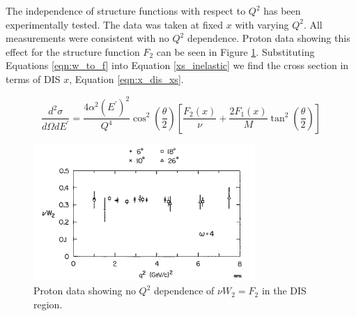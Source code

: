The independence of structure functions with respect to $Q^2$ has been experimentally tested. The data was taken at fixed $x$ with varying $Q^2$. All measurements were consistent with no $Q^2$ dependence. Proton data showing this effect for the structure function $F_2$ can be seen in Figure \ref{fig:noQ2F2}. Substituting Equations \ref{eqn:w_to_f} into Equation \ref{xs_inelastic} we find the cross section in terms of DIS $x$, Equation \ref{eqn:x_dis_xs}.

\begin{equation}
	\frac{d^2\sigma}{d\Omega dE^\prime} = \frac{4\alpha^2\left(E^\prime\right)^2}{Q^4}\cos^2\left(\frac{\theta}{2}\right) \left[\frac{F_2\left(x\right)}{\nu} + \frac{2F_1\left(x\right)}{M}\tan^2\left(\frac{\theta}{2}\right)\right]
	\label{eqn:x_dis_xs}
\end{equation}

\begin{figure}
\begin{center}
	\includegraphics[width=0.75\textwidth]{./scattering/fig/no_q2_dep.png}
	\caption{Proton data showing no $Q^2$ dependence of $\nu W_2=F_2$ in the DIS region.\cite{FriedmanKendall}}
	\label{fig:noQ2F2}
\end{center}
\end{figure}